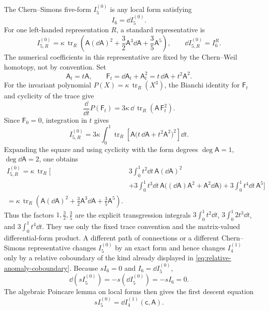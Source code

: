 The Chern--Simons five-form \(I_5^{(0)}\) is any local form satisfying
\[
  I_6=\dd I_5^{(0)}.
\]
For one left-handed representation \(R\), a standard representative is
\[
  I_{5,R}^{(0)}
  =
  \kappa\,\operatorname{tr}_R
  \left(
    \mathsf A(\dd\mathsf A)^2
    +
    \frac32\mathsf A^3\dd\mathsf A
    +
    \frac35\mathsf A^5
  \right),
  \qquad
  \dd I_{5,R}^{(0)}=I_6^R .
\]
The numerical coefficients in this representative are fixed by the
Chern--Weil homotopy, not by convention.  Set
\[
  \mathsf A_t=t\mathsf A,\qquad
  \mathsf F_t=\dd\mathsf A_t+\mathsf A_t^2
  =t\,\dd\mathsf A+t^2\mathsf A^2 .
\]
For the invariant polynomial
\(P(X)=\kappa\,\operatorname{tr}_R(X^3)\), the Bianchi identity for
\(\mathsf F_t\) and cyclicity of the trace give
\[
  \frac{\dd}{\dd t}P(\mathsf F_t)
  =
  3\kappa\,\dd\,\operatorname{tr}_R(\mathsf A\,\mathsf F_t^2).
\]
Since \(\mathsf F_0=0\), integration in \(t\) gives
\[
  I_{5,R}^{(0)}
  =
  3\kappa\int_0^1
  \operatorname{tr}_R\!\left[
    \mathsf A
    \bigl(t\,\dd\mathsf A+t^2\mathsf A^2\bigr)^2
  \right]\dd t .
\]
Expanding the square and using cyclicity with the form degrees
\(\deg\mathsf A=1\), \(\deg\dd\mathsf A=2\), one obtains
\[
\begin{aligned}
  I_{5,R}^{(0)}
  =
  \kappa\,\operatorname{tr}_R
  \biggl[
    &3\!\int_0^1 t^2\dd t\,
      \mathsf A(\dd\mathsf A)^2
\\
    &+3\!\int_0^1 t^3\dd t\,
      \mathsf A\bigl((\dd\mathsf A)\mathsf A^2
      +\mathsf A^2\dd\mathsf A\bigr)
    +3\!\int_0^1 t^4\dd t\,\mathsf A^5
  \biggr]
\\
  =
  \kappa\,\operatorname{tr}_R
  \left(
    \mathsf A(\dd\mathsf A)^2
    +\frac32\mathsf A^3\dd\mathsf A
    +\frac35\mathsf A^5
  \right).
\end{aligned}
\]
Thus the factors \(1,\frac32,\frac35\) are the explicit transgression
integrals \(3\int_0^1t^2\dd t\),
\(3\int_0^1 2t^3\dd t\), and
\(3\int_0^1t^4\dd t\).  They use only the fixed trace convention and the
matrix-valued differential-form product.  A different path of connections or
a different Chern--Simons representative changes \(I_5^{(0)}\) by an exact
form and hence changes \(I_4^{(1)}\) only by a relative coboundary of the
kind already displayed in \eqref{eq:relative-anomaly-coboundary}.
Because \(sI_6=0\) and \(I_6=\dd I_5^{(0)}\),
\[
  \dd(sI_5^{(0)})=-s(\dd I_5^{(0)})=-sI_6=0 .
\]
The algebraic Poincare lemma on local forms then gives the first descent
equation
\begin{equation}
  s I_5^{(0)}
  =
  \dd I_4^{(1)}(\mathsf c,\mathsf A).
  \label{eq:first-brst-descent}
\end{equation}
